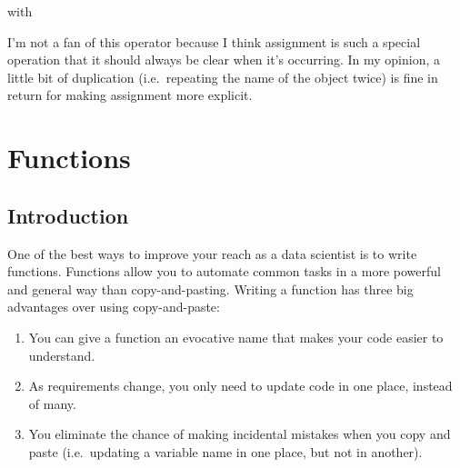\documentclass[]{book}
\newenvironment{Shaded}{\begin{snugshade}}{\end{snugshade}}
\newcommand{\KeywordTok}[1]{\textcolor[rgb]{0.13,0.29,0.53}{\textbf{{#1}}}}
\newcommand{\DataTypeTok}[1]{\textcolor[rgb]{0.13,0.29,0.53}{{#1}}}
\newcommand{\DecValTok}[1]{\textcolor[rgb]{0.00,0.00,0.81}{{#1}}}
\newcommand{\StringTok}[1]{\textcolor[rgb]{0.31,0.60,0.02}{{#1}}}
\newcommand{\NormalTok}[1]{{#1}}
\begin{document}
\begin{itemize}
\begin{Shaded}
\end{Shaded}

  with

\begin{Shaded}
\end{Shaded}

  I'm not a fan of this operator because I think assignment is such a
  special operation that it should always be clear when it's occurring.
  In my opinion, a little bit of duplication (i.e.~repeating the name of
  the object twice) is fine in return for making assignment more
  explicit.
\end{itemize}

\hypertarget{functions}{\chapter{Functions}\label{functions}}

\section{Introduction}\label{introduction-12}

One of the best ways to improve your reach as a data scientist is to
write functions. Functions allow you to automate common tasks in a more
powerful and general way than copy-and-pasting. Writing a function has
three big advantages over using copy-and-paste:

\begin{enumerate}
\def\labelenumi{\arabic{enumi}.}
\item
  You can give a function an evocative name that makes your code easier
  to understand.
\item
  As requirements change, you only need to update code in one place,
  instead of many.
\item
  You eliminate the chance of making incidental mistakes when you copy
  and paste (i.e.~updating a variable name in one place, but not in
  another).
\end{enumerate}
\end{document}
